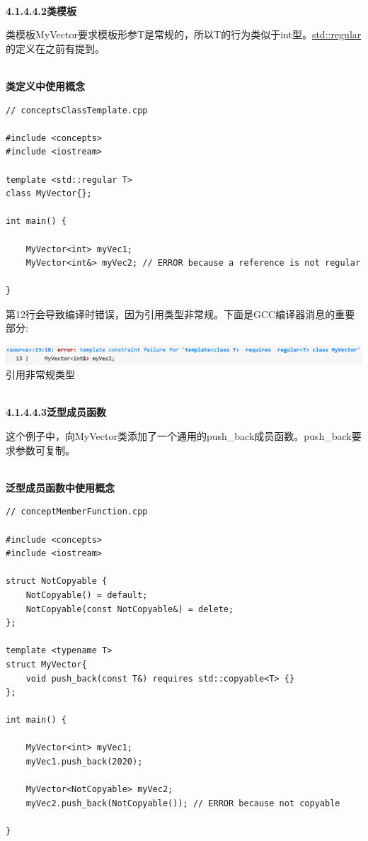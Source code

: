 \hspace*{\fill} \\ %
\noindent
\textbf{4.1.4.4.2\hspace{0.2cm}类模板}

类模板MyVector要求模板形参T是常规的，所以T的行为类似于int型。\href{https://en.cppreference.com/w/cpp/concepts/regular}{std::regular}的定义在之前有提到。

\hspace*{\fill} \\ %
\noindent
\textbf{类定义中使用概念}
\begin{lstlisting}[style=styleCXX]
// conceptsClassTemplate.cpp

#include <concepts>
#include <iostream>

template <std::regular T>
class MyVector{};

int main() {

	MyVector<int> myVec1;
	MyVector<int&> myVec2; // ERROR because a reference is not regular

}
\end{lstlisting}

第12行会导致编译时错误，因为引用类型非常规。下面是GCC编译器消息的重要部分:

\begin{center}
\includegraphics[width=1.0\textwidth]{content/3/chapter4/images/1-3.png}\\
引用非常规类型
\end{center}

\hspace*{\fill} \\ %
\noindent
\textbf{4.1.4.4.3\hspace{0.2cm}泛型成员函数}

这个例子中，向MyVector类添加了一个通用的push\_back成员函数。push\_back要求参数可复制。

\hspace*{\fill} \\ %
\noindent
\textbf{泛型成员函数中使用概念}
\begin{lstlisting}[style=styleCXX]
// conceptMemberFunction.cpp

#include <concepts>
#include <iostream>

struct NotCopyable {
	NotCopyable() = default;
	NotCopyable(const NotCopyable&) = delete;
};

template <typename T>
struct MyVector{
	void push_back(const T&) requires std::copyable<T> {}
};

int main() {

	MyVector<int> myVec1;
	myVec1.push_back(2020);
	
	MyVector<NotCopyable> myVec2;
	myVec2.push_back(NotCopyable()); // ERROR because not copyable

}
\end{lstlisting}

